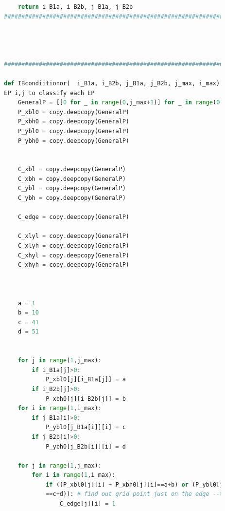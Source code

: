 \documentclass[12pt]{article}
\begin{document}
\begin{scriptsize}
\begin{lstlisting}[language=python,caption={Python code--Functions for Grid Generator}]
        
        
            return i_B1a, i_B2b, j_B1a, j_B2b
        ##########################################################################################
        
        
        
        
        ##########################################################################################
        
        def IBcondiitionor(  i_B1a, i_B2b, j_B1a, j_B2b, j_max, i_max): # use each \
        EP i,j to classify each EP
            GeneralP = [[0 for _ in range(0,j_max+1)] for _ in range(0,i_max+1)]
            P_xbl0 = copy.deepcopy(GeneralP)
            P_xbh0 = copy.deepcopy(GeneralP)
            P_ybl0 = copy.deepcopy(GeneralP)
            P_ybh0 = copy.deepcopy(GeneralP)
        
        
            C_xbl = copy.deepcopy(GeneralP)
            C_xbh = copy.deepcopy(GeneralP)
            C_ybl = copy.deepcopy(GeneralP)
            C_ybh = copy.deepcopy(GeneralP)
        
            C_edge = copy.deepcopy(GeneralP)
        
            C_xlyl = copy.deepcopy(GeneralP)
            C_xlyh = copy.deepcopy(GeneralP)
            C_xhyl = copy.deepcopy(GeneralP)
            C_xhyh = copy.deepcopy(GeneralP)
        
            
        
            a = 1
            b = 10
            c = 41
            d = 51
        
        
            for j in range(1,j_max):
                if i_B1a[j]>0:
                    P_xbl0[j][i_B1a[j]] = a
                if i_B2b[j]>0:
                    P_xbh0[j][i_B2b[j]] = b
            for i in range(1,i_max):
                if j_B1a[i]>0:
                    P_ybl0[j_B1a[i]][i] = c
                if j_B2b[i]>0:
                    P_ybh0[j_B2b[i]][i] = d
        
            for j in range(1,j_max):
                for i in range(1,i_max):
                    if ((P_xbl0[j][i] + P_xbh0[j][i]==a+b) or (P_ybl0[j][i] + P_ybh0[j][i]\
                    ==c+d)): # find out grid point just on the edge -->C_edge
                        C_edge[j][i] = 1  
        

\end{lstlisting}
\end{scriptsize}
\end{document}
